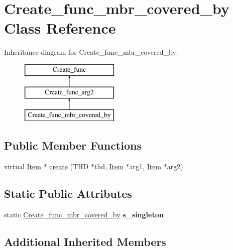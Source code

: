 \hypertarget{classCreate__func__mbr__covered__by}{}\section{Create\+\_\+func\+\_\+mbr\+\_\+covered\+\_\+by Class Reference}
\label{classCreate__func__mbr__covered__by}
Inheritance diagram for Create\+\_\+func\+\_\+mbr\+\_\+covered\+\_\+by\+:\begin{figure}[H]
\begin{center}
\leavevmode
\includegraphics[height=3.000000cm]{classCreate__func__mbr__covered__by}
\end{center}
\end{figure}
\subsection*{Public Member Functions}
\begin{DoxyCompactItemize}
\item 
virtual \mbox{\hyperlink{classItem}{Item}} $\ast$ \mbox{\hyperlink{classCreate__func__mbr__covered__by_a5ac25291a7a9530a72a191555643d8a5}{create}} (T\+HD $\ast$thd, \mbox{\hyperlink{classItem}{Item}} $\ast$arg1, \mbox{\hyperlink{classItem}{Item}} $\ast$arg2)
\end{DoxyCompactItemize}
\subsection*{Static Public Attributes}
\begin{DoxyCompactItemize}
\item 
\mbox{\label{classCreate__func__mbr__covered__by_a254c70d3f85608a9edfd702bffbee38a}} 
static \mbox{\hyperlink{classCreate__func__mbr__covered__by}{Create\+\_\+func\+\_\+mbr\+\_\+covered\+\_\+by}} {\bfseries s\+\_\+singleton}
\end{DoxyCompactItemize}
\subsection*{Additional Inherited Members}


